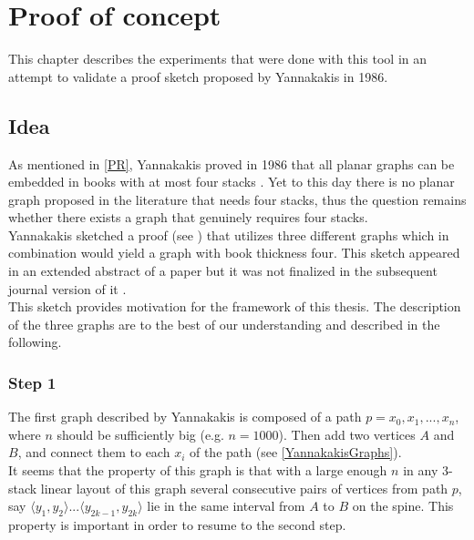 
\chapter{Proof of concept}
  \label{POC}
  
This chapter describes the experiments that were done with this tool in an attempt to validate a proof sketch proposed by Yannakakis \cite{yannakakis1986four} in 1986.
\section{Idea}
As mentioned in \autoref{PR}, Yannakakis proved in 1986 that all planar graphs can be embedded in books with at most four stacks \cite{yannakakis1986four, yannakakis1989embedding}. Yet to this day there is no planar graph proposed in the literature that needs four stacks, thus the question remains whether there exists a graph that genuinely requires four stacks.  \\
Yannakakis sketched a proof (see \cite{yannakakis1986four}) that utilizes three different graphs which in combination would yield a graph with book thickness four. This sketch appeared in an extended abstract of a paper but it was not finalized in the subsequent journal version of it \cite{yannakakis1989embedding}.\\
This sketch provides motivation for the framework of this thesis. The description of the three graphs are to the best of our understanding and described in the following.

\subsection{Step 1}
\label{S1}
The first graph described by Yannakakis is composed of a path $p = x_0, x_1, ..., x_n$, where $n$ should be sufficiently big (e.g. $n = 1000$). Then add two vertices $A$ and $B$, and connect them to each $x_i$ of the path (see \autoref{YannakakisGraphs}).\\
It seems that the property of this graph is that with a large enough $n$ in any 3-stack linear layout of this graph several consecutive pairs of vertices from path $p$, say $\langle y_1, y_2 \rangle ... \langle y_{2k-1}, y_{2k} \rangle$ lie in the same interval from $A$ to $B$ on the spine. 
This property is important in order to resume to the second step.

